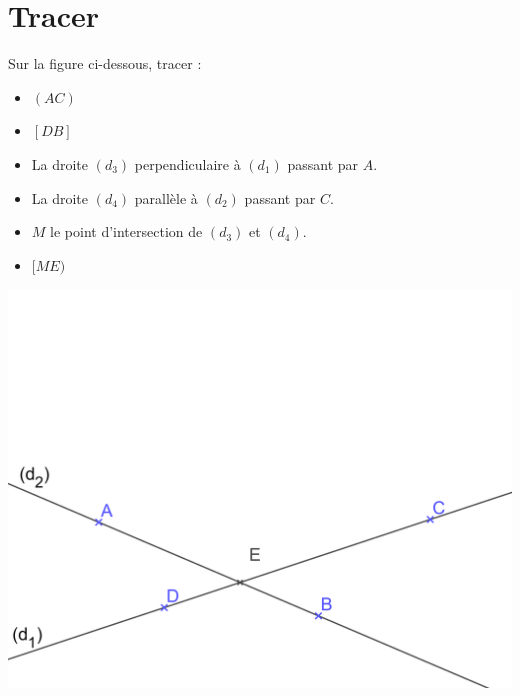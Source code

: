 \documentclass[a4paper,12pt]{exam}
\begin{document}
\newpage


\section{Tracer}

Sur la figure ci-dessous, tracer :

\begin{itemize}
	\item $(AC)$
	\item $[DB]$
	\item La droite $(d_3)$ perpendiculaire à $(d_1)$ passant par $A$.
	\item La droite $(d_4)$ parallèle à $(d_2)$ passant par $C$. 
	\item $M$ le point d'intersection de $(d_3)$ et $(d_4)$.
	\item $[ME)$

\end{itemize}

\vspace*{3cm}
\begin{center}
	\includegraphics[scale=0.2]{img/fig}	
\end{center}




\label{LastPage}
\end{document}
